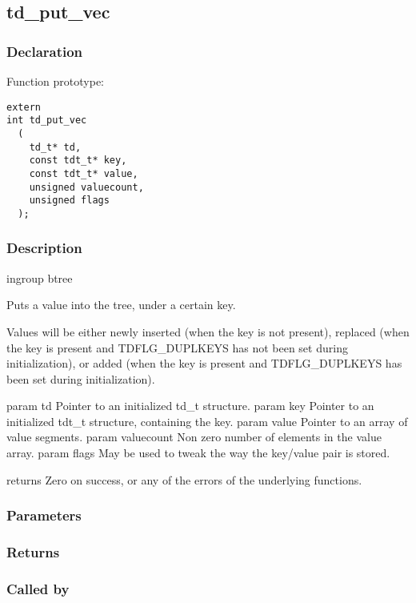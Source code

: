 
\newpage
\subsection{td\_put\_vec}
\subsubsection{Declaration} Function prototype:

\begin{verbatim}
extern
int td_put_vec
  (
    td_t* td,
    const tdt_t* key,
    const tdt_t* value,
    unsigned valuecount,
    unsigned flags
  );
\end{verbatim}

\subsubsection{Description}


 ingroup btree

 Puts a value into the tree, under a certain key.

 Values will be either newly inserted (when the key is not present),
 replaced (when the key is present and TDFLG\_DUPLKEYS has not been set during
 initialization), or added (when the key is present and TDFLG\_DUPLKEYS
 has been set during initialization).

 param td Pointer to an initialized td\_t structure.
 param key Pointer to an initialized tdt\_t structure, containing the key.
 param value Pointer to an array of value segments.
 param valuecount Non zero number of elements in the value array.
 param flags May be used to tweak the way the key/value pair is stored.

 returns Zero on success, or any of the errors of the underlying
 functions.
 

\subsubsection{Parameters}
\subsubsection{Returns}
\subsubsection{Called by}
